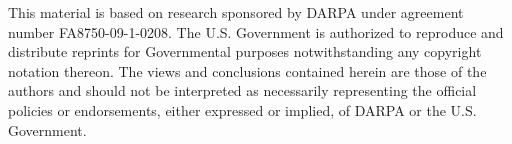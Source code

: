 \documentclass[12pt,letterpaper]{report}
\begin{document}
This material is based on research sponsored by DARPA under agreement number 
FA8750-09-1-0208. The U.S. Government is authorized to reproduce and distribute 
reprints for Governmental purposes notwithstanding any copyright notation 
thereon. The views and conclusions contained herein are those of the authors and
should not be interpreted as necessarily representing the official policies or 
endorsements, either expressed or implied, of DARPA or the U.S. Government.
  
\afteracknowledgementsp












\bibliographyp




\appendixpages       %
%
\end{document}
